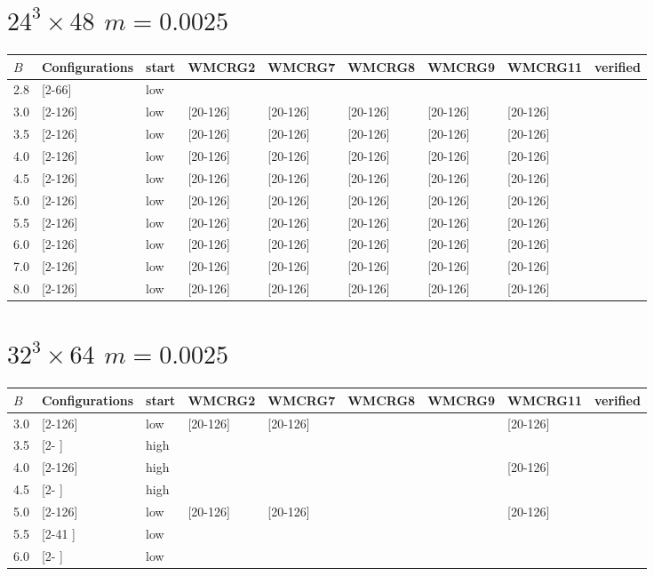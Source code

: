 \documentclass{article}
\begin{document}
  \section*{$24^3\times48$  $m=0.0025$}
    \begin{tabular}{| l | l | l | l | l | l | l | l | l |}
      \hline
      $B$ & Configurations & start & WMCRG2 & WMCRG7 & WMCRG8 & WMCRG9 & WMCRG11 & verified\\
      \hline
      2.8 & [2-66]  & low &  &  &  &  &  &\\
      3.0 & [2-126] & low & [20-126] & [20-126] & [20-126] & [20-126] & [20-126] &\\
      3.5 & [2-126] & low & [20-126] & [20-126] & [20-126] & [20-126] & [20-126] &\\
      4.0 & [2-126] & low & [20-126] & [20-126] & [20-126] & [20-126] & [20-126] &\\
      4.5 & [2-126] & low & [20-126] & [20-126] & [20-126] & [20-126] & [20-126] &\\
      5.0 & [2-126] & low & [20-126] & [20-126] & [20-126] & [20-126] & [20-126] &\\
      5.5 & [2-126] & low & [20-126] & [20-126] & [20-126] & [20-126] & [20-126] &\\
      6.0 & [2-126] & low & [20-126] & [20-126] & [20-126] & [20-126] & [20-126] &\\
      7.0 & [2-126] & low & [20-126] & [20-126] & [20-126] & [20-126] & [20-126] &\\
      8.0 & [2-126] & low & [20-126] & [20-126] & [20-126] & [20-126] & [20-126] &\\
      \hline
    \end{tabular}
  \section*{$32^3\times64$  $m=0.0025$}
    \begin{tabular}{| l | l | l | l | l | l | l | l | l |}
      \hline
      $B$ & Configurations & start & WMCRG2 & WMCRG7 & WMCRG8 & WMCRG9 & WMCRG11 & verified\\
      \hline
      3.0 & [2-126] & low  & [20-126] & [20-126] &  &  & [20-126] &\\
      3.5 & [2-   ] & high &  &  &  &  &  &\\
      4.0 & [2-126] & high &  &  &  &  & [20-126] &\\
      4.5 & [2-   ] & high &  &  &  &  &  &\\
      5.0 & [2-126] & low  & [20-126] & [20-126] &  &  & [20-126] &\\
      5.5 & [2-41 ] & low  &  &  &  &  &  &\\
      6.0 & [2-   ] & low  &  &  &  &  &  &\\
      \hline
    \end{tabular}
\end{document}
